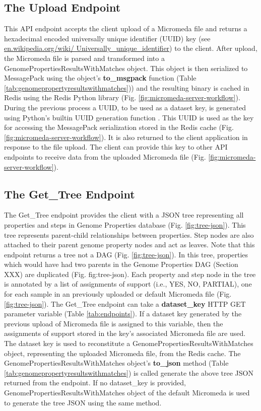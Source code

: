 \subsection{The Upload Endpoint} \label{endpoint-upload}

This API endpoint accepts the client upload of a Micromeda file and returns a hexadecimal encoded universally unique identifier (UUID) key \cite{leach2005universally} (see \href{en.wikipedia.org/wiki/Universally\_unique\_identifier}{en.wikipedia.org/wiki/ Universally\_unique\_identifier}) to the client. After upload, the Micromeda file is parsed and transformed into a GenomePropertiesResultsWithMatches object. This object is then serialized to MessagePack using the object's \textbf{to\_msgpack} function (Table \ref{tab:genomepropertyresultswithmatches})) and the resulting binary is cached in Redis using the Redis Python library \cite{mccurdy_2019} (Fig. \ref{fig:micromeda-server-workflow}). During the previous process a UUID, to be used as a dataset key, is generated using Python's builtin UUID generation function \cite{PythonUUID}. This UUID is used as the key for accessing the MessagePack serialization stored in the Redis cache (Fig. \ref{fig:micromeda-server-workflow}). It is also returned to the client application in response to the file upload. The client can provide this key to other API endpoints to receive data from the uploaded Micromeda file (Fig. \ref{fig:micromeda-server-workflow}). 

\subsection{The Get\_Tree Endpoint} \label{get-tree}

The Get\_Tree endpoint provides the client with a JSON tree representing all properties and steps in Genome Properties database (Fig. \ref{fig:tree-json}). This tree represents parent-child relationships between properties. Step nodes are also attached to their parent genome property nodes and act as leaves. Note that this endpoint returns a tree not a DAG (Fig. \ref{fig:tree-json}). In this tree, properties which would have had two parents in the Genome Properties DAG (Section XXX) are duplicated (Fig. fig:tree-json). Each property and step node in the tree is annotated by a list of assignments of support (i.e., YES, NO, PARTIAL), one for each sample in an previously uploaded or default Micromeda file (Fig. \ref{fig:tree-json}). The Get\_Tree endpoint can take a \textbf{dataset\_key} HTTP GET parameter variable (Table \ref{tab:endpoints}). If a dataset key generated by the previous upload of Micromeda file is assigned to this variable, then the assignments of support stored in the key's associated Micromeda file are used. The dataset key is used to reconstitute a GenomePropertiesResultsWithMatches object, representing the uploaded Micromeda file, from the Redis cache. The GenomePropertiesResultsWithMatches object's \textbf{to\_json} method (Table \ref{tab:genomepropertyresultswithmatches}) is called generate the above tree JSON returned from the endpoint. If no dataset\_key is provided, GenomePropertiesResultsWithMatches object of the default Micromeda is used to generate the tree JSON using the same method.

